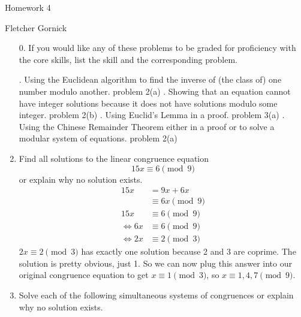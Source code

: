 \documentclass[11pt]{article}
\newcommand{\n}{\vspace{0.5cm}}
\begin{document}
  \begin{center}
    {\Large Homework 4} \n

    Fletcher Gornick
  \end{center}

  \begin{enumerate}
    \item[0.] If you would like any of these problems to be graded for proficiency with the core skills, list the skill and the corresponding problem.
      \begin{outline}
        . Using the Euclidean algorithm to find the inverse of (the class of) one number modulo another.
          \2 problem 2(a)
        . Showing that an equation cannot have integer solutions because it does not have solutions modulo some integer.
          \2 problem 2(b)
        . Using Euclid’s Lemma in a proof.
          \2 problem 3(a)
        . Using the Chinese Remainder Theorem either in a proof or to solve a modular system of equations.
          \2 problem 2(a)
      \end{outline} \n

    \item Find all solutions to the linear congruence equation \[15x \equiv 6 \pmod 9\] or explain why no solution exists.
      \begin{align*}
        15x      &= 9x + 6x \\
                 &\equiv 6x \pmod 9 \\
        15x      &\equiv 6 \pmod 9 \\
        \iff 6x  &\equiv 6 \pmod 9 \\
        \iff 2x  &\equiv 2 \pmod 3
      \end{align*}
      \(2x \equiv 2 \pmod 3\) has exactly one solution because 2 and 3 are coprime.  The solution is pretty obvious, just 1.  So we can now plug this answer into our original congruence equation to get \(x \equiv 1 \pmod 3\), so \(x \equiv 1,4,7 \pmod 9\).

    \item Solve each of the following simultaneous systems of congruences or explain why no solution exists.


\end{enumerate}
\end{document}
